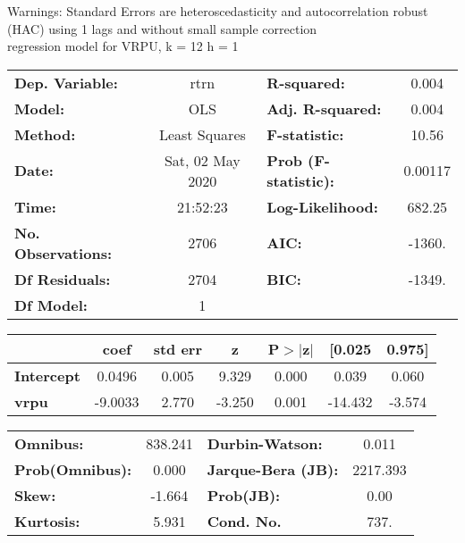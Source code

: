 Warnings: \newline
 [1] Standard Errors are heteroscedasticity and autocorrelation robust (HAC) using 1 lags and without small sample correction\\ 

regression model for VRPU, k = 12 h = 1\begin{center}
\begin{tabular}{lclc}
\toprule
\textbf{Dep. Variable:}    &       rtrn       & \textbf{  R-squared:         } &     0.004   \\
\textbf{Model:}            &       OLS        & \textbf{  Adj. R-squared:    } &     0.004   \\
\textbf{Method:}           &  Least Squares   & \textbf{  F-statistic:       } &     10.56   \\
\textbf{Date:}             & Sat, 02 May 2020 & \textbf{  Prob (F-statistic):} &  0.00117    \\
\textbf{Time:}             &     21:52:23     & \textbf{  Log-Likelihood:    } &    682.25   \\
\textbf{No. Observations:} &        2706      & \textbf{  AIC:               } &    -1360.   \\
\textbf{Df Residuals:}     &        2704      & \textbf{  BIC:               } &    -1349.   \\
\textbf{Df Model:}         &           1      & \textbf{                     } &             \\
\bottomrule
\end{tabular}
\begin{tabular}{lcccccc}
                   & \textbf{coef} & \textbf{std err} & \textbf{z} & \textbf{P$> |$z$|$} & \textbf{[0.025} & \textbf{0.975]}  \\
\midrule
\textbf{Intercept} &       0.0496  &        0.005     &     9.329  &         0.000        &        0.039    &        0.060     \\
\textbf{vrpu}      &      -9.0033  &        2.770     &    -3.250  &         0.001        &      -14.432    &       -3.574     \\
\bottomrule
\end{tabular}
\begin{tabular}{lclc}
\textbf{Omnibus:}       & 838.241 & \textbf{  Durbin-Watson:     } &    0.011  \\
\textbf{Prob(Omnibus):} &   0.000 & \textbf{  Jarque-Bera (JB):  } & 2217.393  \\
\textbf{Skew:}          &  -1.664 & \textbf{  Prob(JB):          } &     0.00  \\
\textbf{Kurtosis:}      &   5.931 & \textbf{  Cond. No.          } &     737.  \\
\bottomrule
\end{tabular}
\end{center}

